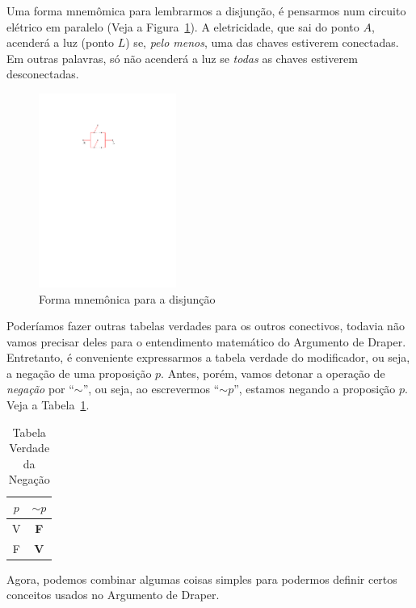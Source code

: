 \documentclass[12pt]{article}
\theoremstyle{definition}
\newcommand{\V}{\textbf{V}}
\newcommand{\F}{\textbf{F}}
\newcommand{\N}{\ensuremath{\sim\!}}
\begin{document}
Uma forma mnemômica para lembrarmos a disjunção, é pensarmos num circuito 
elétrico em paralelo (Veja a Figura~\ref{fig:circ-para}).
A eletricidade, que sai do ponto $A$, acenderá a luz (ponto $L$) se,
\textit{pelo menos}, uma das chaves estiverem conectadas.
Em outras palavras, só não acenderá a luz se \textit{todas} as chaves estiverem
desconectadas.

\begin{figure}[!h]%
\centering
\includegraphics[width=0.4\textwidth]{circuito-em-paralelo}%
\caption{Forma mnemônica para a disjunção}%
\label{fig:circ-para}%
\end{figure}

Poderíamos fazer outras tabelas verdades para os outros conectivos, todavia não
vamos precisar deles para o entendimento matemático do Argumento de Draper.
Entretanto, é conveniente expressarmos a tabela verdade do modificador, ou seja,
a negação de uma proposição $p$. Antes, porém, vamos detonar a operação de
\textit{negação} por ``$\sim$'', ou seja, ao escrevermos ``$\N p$'', estamos
negando a proposição $p$. Veja a Tabela~\ref{tab:negacao}.

\begin{table}[!htbp]%
\centering
\scalebox{0.8}
 {
  \begin{tabular}{cc}
	  \toprule
    $p$ & $\N p$ \\
	  \midrule
    V   &  \F  \\
	  	F   &  \V  \\
	  \bottomrule
  \end{tabular}
 }
\caption{Tabela Verdade da Negação}
\label{tab:negacao}
\end{table}

Agora, podemos combinar algumas coisas simples para podermos definir certos
conceitos usados no Argumento de Draper.
\end{document}
